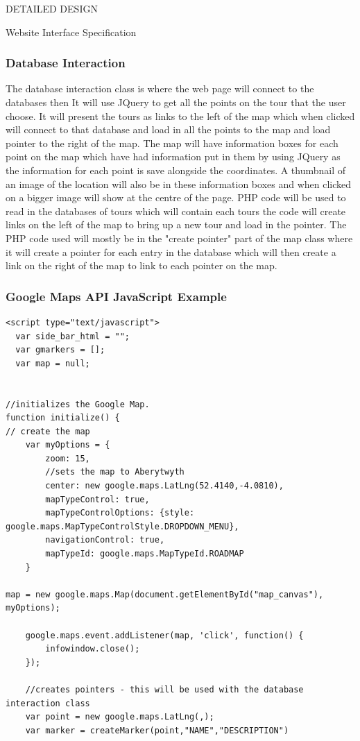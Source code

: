 \documentclass{article}
\begin{document}
\begin{section}{DETAILED DESIGN}
\begin{subsection}{Website Interface Specification}
		\subsubsection{Database Interaction}
			The database interaction class is where the web page will connect to the databases then It will use JQuery to get all the points on the tour that the user choose. It will present the tours as links to the left of the map which when clicked will connect to that database and load in all the points to the map and load pointer to the right of the map. The map will have information boxes for each point on the map which have had information put in them by using JQuery as the information for each point is save alongside the coordinates. A thumbnail of an image of the location will also be in these information boxes and when clicked on a bigger image will show at the centre of the page. PHP code will be used to read in the databases of tours which will contain each tours the code will create links on the left of the map to bring up a new tour and load in the pointer. The PHP code used will mostly be in the "create pointer" part of the map class where it will create a pointer for each entry in the database which will then create a link on the right of the map to link to each pointer on the map.

		\subsubsection{Google Maps API JavaScript Example}
		\begin{lstlisting}[caption=Google Maps API Javascript Example]
<script type="text/javascript"> 
  var side_bar_html = ""; 
  var gmarkers = []; 
  var map = null;
  
  
//initializes the Google Map.
function initialize() {
// create the map
	var myOptions = {
		zoom: 15,
		//sets the map to Aberytwyth
		center: new google.maps.LatLng(52.4140,-4.0810),
		mapTypeControl: true,
		mapTypeControlOptions: {style: google.maps.MapTypeControlStyle.DROPDOWN_MENU},
		navigationControl: true,
		mapTypeId: google.maps.MapTypeId.ROADMAP
	}
	
map = new google.maps.Map(document.getElementById("map_canvas"), myOptions);

	google.maps.event.addListener(map, 'click', function() {
		infowindow.close();
	});

	//creates pointers - this will be used with the database interaction class
	var point = new google.maps.LatLng(,);
	var marker = createMarker(point,"NAME","DESCRIPTION")


\end{lstlisting}
\end{subsection}
\end{section}
\end{document}
